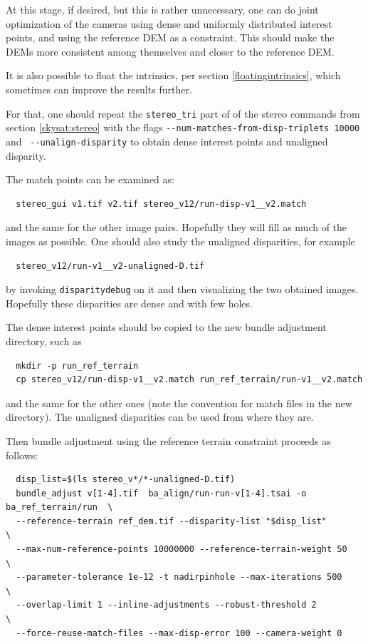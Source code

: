 At this stage, if desired, but this is rather unnecessary, 
one can do joint optimization of the cameras using dense
and uniformly distributed interest points, and using the reference DEM as a constraint.
This should make the DEMs more consistent among themselves and closer to the reference DEM.

It is also possible to float the intrinsics, per section \ref{floatingintrinsics},
which sometimes can improve the results further. 

For that, one should repeat the \texttt{stereo\_tri} part of
of the stereo commands from section \ref{skysat:stereo}
with the flags 
\texttt{-\/-num-matches-from-disp-triplets 10000} and \
\texttt{-\/-unalign-disparity} to obtain dense interest points
and unaligned disparity. 

The match points can be examined as:
\begin{verbatim}
  stereo_gui v1.tif v2.tif stereo_v12/run-disp-v1__v2.match
\end{verbatim}
and the same for the other image pairs. Hopefully they will fill as much
of the images as possible. One should also study the unaligned disparities,
for example
\begin{verbatim}
  stereo_v12/run-v1__v2-unaligned-D.tif
\end{verbatim}
by invoking \texttt{disparitydebug} on it and then visualizing the two
obtained images. Hopefully these disparities are dense and with few holes. 

The dense interest points should be copied to the new bundle adjustment directory, such as
\begin{verbatim}
  mkdir -p run_ref_terrain
  cp stereo_v12/run-disp-v1__v2.match run_ref_terrain/run-v1__v2.match
\end{verbatim}

and the same for the other ones (note the convention for match files in the new directory).
The unaligned disparities can be used from where they are. 

Then bundle adjustment using the reference terrain constraint proceeds as follows:
\begin{verbatim}
  disp_list=$(ls stereo_v*/*-unaligned-D.tif)
  bundle_adjust v[1-4].tif  ba_align/run-run-v[1-4].tsai -o ba_ref_terrain/run  \
  --reference-terrain ref_dem.tif --disparity-list "$disp_list"                 \
  --max-num-reference-points 10000000 --reference-terrain-weight 50             \ 
  --parameter-tolerance 1e-12 -t nadirpinhole --max-iterations 500              \
  --overlap-limit 1 --inline-adjustments --robust-threshold 2                   \
  --force-reuse-match-files --max-disp-error 100 --camera-weight 0
\end{verbatim}

